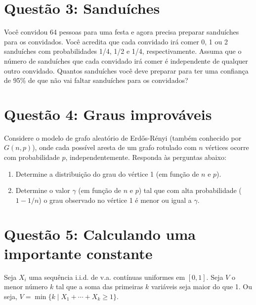 \documentclass[12 pt]{article}
\begin{document}
\section*{Questão 3: Sanduíches}

Você convidou 64 pessoas para uma festa e agora precisa preparar sanduíches para os convidados. Você acredita que cada convidado irá comer 0, 1 ou 2 sanduíches com probabilidades 1/4, 1/2 e 1/4, respectivamente. Assuma que o número de sanduíches que cada convidado irá comer é independente de qualquer outro convidado. Quantos sanduíches você deve preparar para ter uma confiança de 95\% de que não vai faltar sanduíches para os convidados?
\begin{tcolorbox}[colframe=black, title=Resposta:]

\end{tcolorbox}

\section*{Questão 4: Graus improváveis}

Considere o modelo de grafo aleatório de Erdős-Rényi (também conhecido por $G(n, p)$), onde cada possível aresta de um grafo rotulado com $n$ vértices ocorre com probabilidade $p$, independentemente. Responda às perguntas abaixo:

\begin{enumerate}
    \item Determine a distribuição do grau do vértice 1 (em função de $n$ e $p$).
    \begin{tcolorbox}[colframe=black, title=Resposta:]

    \end{tcolorbox}
    \item Determine o valor $\gamma$ (em função de $n$ e $p$) tal que com alta probabilidade ($1 - 1/n$) o grau observado no vértice 1 é menor ou igual a $\gamma$.
    \begin{tcolorbox}[colframe=black, title=Resposta:]

    \end{tcolorbox}
\end{enumerate}

\section*{Questão 5: Calculando uma importante constante}

Seja $X_i$ uma sequência i.i.d. de v.a. contínuas uniformes em $[0, 1]$. Seja $V$ o menor número $k$ tal que a soma das primeiras $k$ variáveis seja maior do que 1. Ou seja, $V = \min\{k \mid X_1 + \cdots + X_k \geq 1\}$.
\end{document}

